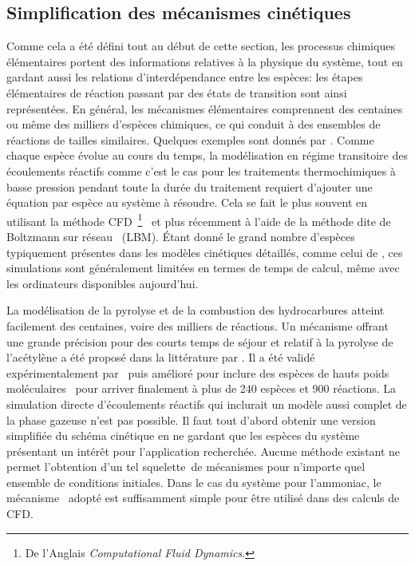 \subsection{Simplification des mécanismes cinétiques}
\label{sec:simplification_cinetique_lu_and_law}

Comme cela a été défini tout au début de cette section, les processus chimiques élémentaires portent des informations relatives à la physique du système, tout en gardant aussi les relations d'interdépendance entre les espèces: les étapes élémentaires de réaction passant par des états de transition sont ainsi représentées.  En général, les mécanismes élémentaires comprennent des centaines ou même des milliers d'espèces chimiques, ce qui conduit à des ensembles de réactions de tailles similaires. Quelques exemples sont donnés par \citet{Coles2011}. Comme chaque espèce évolue au cours du temps, la modélisation en régime transitoire des écoulements réactifs \textendash{} comme c'est le cas pour les traitements thermochimiques à basse pression pendant toute la durée du traitement \textendash{} requiert d'ajouter une équation par espèce au système à résoudre.  Cela se fait le plus souvent en utilisant la méthode CFD~\footnote{De l'Anglais \textit{Computational Fluid Dynamics}.}~\cite{Liang2009} et plus récemment à l'aide de la méthode dite de Boltzmann sur réseau~\cite{Li20131194,Sullivan2006206} (LBM). Étant donné le grand nombre d'espèces typiquement présentes dans les modèles cinétiques détaillés, comme celui de \citet{Norinaga2009}, ces simulations sont généralement limitées en termes de temps de calcul, même avec les ordinateurs disponibles aujourd'hui. 

La modélisation de la pyrolyse et de la combustion des hydrocarbures atteint facilement des centaines, voire des milliers de réactions. Un mécanisme offrant une grande précision pour des courts temps de séjour et relatif à la pyrolyse 
de l'acétylène a été proposé dans la littérature par \citet{Norinaga2007,Norinaga2007ii}.  Il a été validé expérimentalement par \citet{Norinaga2005} puis amélioré pour inclure des espèces de hauts poids moléculaires~\cite{Norinaga2009} pour arriver finalement à plus de 240 espèces et 900 réactions. La simulation directe d'écoulements réactifs qui inclurait un modèle aussi complet de la phase gazeuse n'est pas possible. Il faut tout d'abord obtenir une version simplifiée du schéma cinétique en ne gardant que les espèces du système présentant un intérêt pour l'application recherchée. Aucune méthode existant ne permet l'obtention d'un tel \og{}squelette\fg{} de mécanismes pour n'importe quel ensemble de conditions initiales. Dans le cas du système  pour l'ammoniac, le mécanisme~\cite{Dirtu2006,Odochian2011} adopté est suffisamment simple pour être utilisé dans des calculs de CFD.

